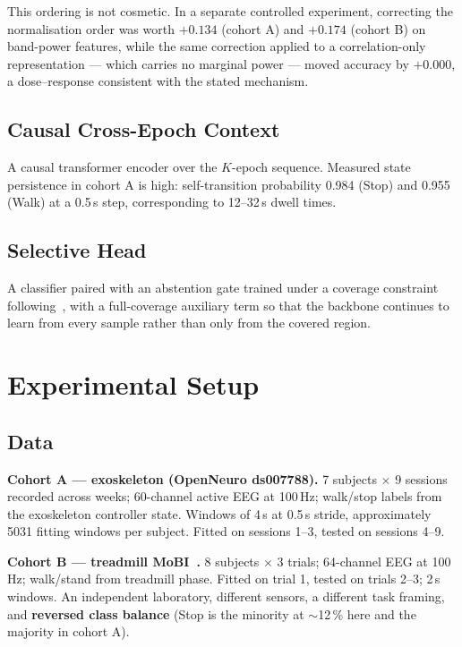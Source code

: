 \documentclass[preprint,12pt]{elsarticle}
\begin{document}
This ordering is not cosmetic. In a separate controlled experiment, correcting
the normalisation order was worth $+0.134$ (cohort A) and $+0.174$ (cohort B) on
band-power features, while the same correction applied to a correlation-only
representation --- which carries no marginal power --- moved accuracy by
$+0.000$, a dose--response consistent with the stated mechanism.

\subsection{Causal Cross-Epoch Context}

A causal transformer encoder over the $K$-epoch sequence. Measured state
persistence in cohort A is high: self-transition probability 0.984 (Stop) and
0.955 (Walk) at a 0.5\,s step, corresponding to 12--32\,s dwell times.

\subsection{Selective Head}

A classifier paired with an abstention gate trained under a coverage constraint
following~\cite{selectivenet}, with a full-coverage auxiliary term so that the
backbone continues to learn from every sample rather than only from the covered
region.

\section{Experimental Setup}

\subsection{Data}

\textbf{Cohort A --- exoskeleton (OpenNeuro ds007788).} 7 subjects $\times$ 9
sessions recorded across weeks; 60-channel active EEG at 100\,Hz; walk/stop
labels from the exoskeleton controller state. Windows of 4\,s at 0.5\,s stride,
approximately 5031 fitting windows per subject. Fitted on sessions 1--3, tested
on sessions 4--9.

\textbf{Cohort B --- treadmill MoBI~\cite{luu}.} 8 subjects $\times$ 3 trials;
64-channel EEG at 100\,Hz; walk/stand from treadmill phase. Fitted on trial 1,
tested on trials 2--3; 2\,s windows. An independent laboratory, different
sensors, a different task framing, and \textbf{reversed class balance} (Stop is
the minority at $\sim$12\,\% here and the majority in cohort A).
\end{document}
